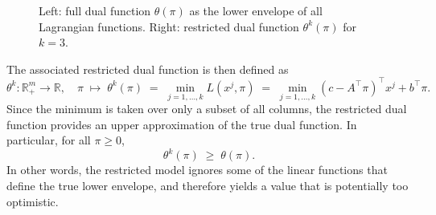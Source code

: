\documentclass{book}
\theoremstyle{definition}
\numberwithin{algorithm_}{chapter}
\begin{document}
\begin{figure} [ht]
\begin{minipage}{0.48\textwidth}
\end{minipage}

\caption{Left: full dual function $\theta(\pi)$ as the lower envelope of all Lagrangian functions. Right: restricted dual function $\theta^k(\pi)$ for $k=3$.}
\label{fig:theta_vs_theta_k}
\end{figure}



The associated restricted dual function is then defined as
\[
\theta^k : \mathbb{R}_+^m \to \mathbb{R}, 
\quad
\pi \;\mapsto\; 
\theta^k(\pi) 
\;=\;
\min_{j=1,\dots,k} L(x^j,\pi)
\;=\;
\min_{j=1,\dots,k}
(c - A^\top \pi)^\top x^j + b^\top \pi.
\]
Since the minimum is taken over only a subset of all columns, the restricted dual function provides an upper approximation of the true dual function. In particular, for all $\pi \ge 0$,
\[
\theta^k(\pi) \;\ge\; \theta(\pi).
\]
In other words, the restricted model ignores some of the linear functions that define the true lower envelope, and therefore yields a value that is potentially too optimistic.
\end{document}
